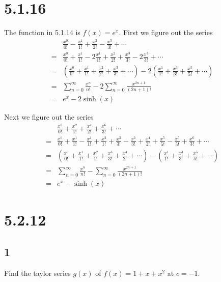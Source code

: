 \documentclass[12pt]{article}
\newcommand{\round}[1]{\left(       #1 \right)      }
\begin{document}
\section*{5.1.16}
The function in 5.1.14 is $f(x) = e^x$. First we figure out the series
\begin{align*}
     & \frac{x^0}{0!} - \frac{x^1}{1!} + \frac{x^2}{2!} - \frac{x^3}{3!} + \cdots \\
    =& \frac{x^0}{0!} + \frac{x^1}{1!} - 2\frac{x^1}{1!} + \frac{x^2}{2!} + \frac{x^3}{3!} - 2\frac{x^3}{3!} + \cdots \\
    =& \round{\frac{x^0}{0!} + \frac{x^1}{1!}  + \frac{x^2}{2!} + \frac{x^3}{3!} + \cdots} - 2 \round{\frac{x^1}{1!} + \frac{x^3}{3!} + \frac{x^5}{5!} + \cdots} \\
    =& \sum_{n=0}^\infty \frac{x^n}{n!} - 2\sum_{n=0}^\infty \frac{x^{2n+1}}{(2n+1)!} \\
    =& e^x - 2\sinh(x)
\end{align*}

Next we figure out the series
\begin{align*}
     & \frac{x^0}{0!} + \frac{x^2}{1!} + \frac{x^4}{2!} + \frac{x^6}{3!} + \cdots \\
    =& \frac{x^0}{0!} + \frac{x^1}{1!} - \frac{x^1}{1!} + \frac{x^2}{1!} + \frac{x^3}{3!} - \frac{x^3}{3!} + \frac{x^4}{2!} + \frac{x^5}{5!} - \frac{x^5}{5!} + \frac{x^6}{3!} + \cdots \\
    =& \round{\frac{x^0}{0!} + \frac{x^1}{1!} + \frac{x^2}{1!} + \frac{x^3}{3!} + \frac{x^4}{2!} + \cdots} - \round{\frac{x^1}{1!} + \frac{x^3}{3!} + \frac{x^5}{5!} + \cdots} \\
    =& \sum_{n=0}^\infty \frac{x^n}{n!} - \sum_{n=0}^\infty \frac{x^{2n+1}}{(2n+1)!} \\
    =& e^x - \sinh(x)
\end{align*}



\section*{5.2.12}

\subsection*{1}
Find the taylor series $g(x)$ of $f(x) = 1 + x + x^2$ at $c=-1$.
\end{document}
